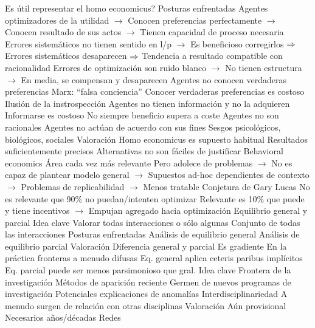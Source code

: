 \documentclass{nuevotema}
\begin{document}
\begin{esquemal}
				\4[$\to$] Es útil representar el homo economicus?
			\3 Posturas enfrentadas
				\4 Agentes optimizadores de la utilidad
				\4[] $\to$ Conocen preferencias perfectamente
				\4[] $\to$ Conocen resultado de sus actos
				\4[] $\to$ Tienen capacidad de proceso necesaria
				\4[] Errores sistemáticos no tienen sentido en l/p
				\4[] $\to$ Es beneficioso corregirlos
				\4[] $\Rightarrow$ Errores sistemáticos desaparecen
				\4[] $\Rightarrow$ Tendencia a resultado compatible con racionalidad
				\4[] Errores de optimización son ruido blanco
				\4[] $\to$ No tienen estructura
				\4[] $\to$ En media, se compensan y desaparecen
				\4 Agentes no conocen verdaderas preferencias
				\4[] Marx: ``falsa conciencia''
				\4[] Conocer verdaderas preferencias es costoso
				\4[] Ilusión de la instrospección
				\4 Agentes no tienen información y no la adquieren
				\4[] Informarse es costoso
				\4[] No siempre beneficio supera a coste
				\4 Agentes no son racionales
				\4[] Agentes no actúan de acuerdo con sus fines
				\4[] Sesgos psicológicos, biológicos, sociales
			\3 Valoración
				\4 Homo economicus es supuesto habitual
				\4[] Resultados suficientemente precisos
				\4[] Alternativas no son fáciles de justificar
				\4 Behavioral economics
				\4[] Área cada vez más relevante
				\4[] Pero adolece de problemas
				\4[] $\to$ No es capaz de plantear modelo general
				\4[] $\to$ Supuestos ad-hoc dependientes de contexto
				\4[] $\to$ Problemas de replicabilidad
				\4[] $\to$ Menos tratable
				\4 Conjetura de Gary Lucas
				\4[] No es relevante que 90\% no puedan/intenten optimizar
				\4[] Relevante es 10\% que puede y tiene incentivos
				\4[] $\to$ Empujan agregado hacia optimización
		\2 Equilibrio general y parcial
			\3 Idea clave
				\4 Valorar todas interacciones o sólo algunas
				\4 Conjunto de todas las interacciones
			\3 Posturas enfrentadas
				\4 Análisis de equilibrio general
				\4 Análisis de equilibrio parcial
			\3 Valoración
				\4 Diferencia general y parcial
				\4[] Es gradiente
				\4 En la práctica fronteras a menudo difusas
				\4[] Eq. general aplica ceteris paribus implícitos
				\4[] Eq. parcial puede ser menos parsimonioso que gral.
	\1 
		\2 Idea clave
			\3 Frontera de la investigación
				\4 Métodos de aparición reciente
				\4[] Germen de nuevos programas de investigación
				\4[] Potenciales explicaciones de anomalías
				\4 Interdisciplinariedad
				\4[] A menudo surgen de relación con otras disciplinas
			\3 Valoración
				\4 Aún provisional
				\4 Necesarios años/décadas
		\2 Redes

\end{esquemal}
\end{document}
